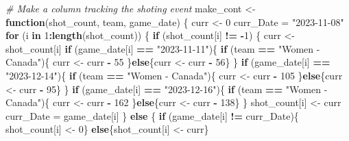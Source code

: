 \documentclass[
  a3paper,
]{article}
\newenvironment{Shaded}{\begin{snugshade}}{\end{snugshade}}
\newcommand{\CommentTok}[1]{\textcolor[rgb]{0.56,0.35,0.01}{\textit{#1}}}
\newcommand{\ControlFlowTok}[1]{\textcolor[rgb]{0.13,0.29,0.53}{\textbf{#1}}}
\newcommand{\DecValTok}[1]{\textcolor[rgb]{0.00,0.00,0.81}{#1}}
\newcommand{\FunctionTok}[1]{\textcolor[rgb]{0.13,0.29,0.53}{\textbf{#1}}}
\newcommand{\NormalTok}[1]{#1}
\newcommand{\OtherTok}[1]{\textcolor[rgb]{0.56,0.35,0.01}{#1}}
\newcommand{\SpecialCharTok}[1]{\textcolor[rgb]{0.81,0.36,0.00}{\textbf{#1}}}
\newcommand{\StringTok}[1]{\textcolor[rgb]{0.31,0.60,0.02}{#1}}
\begin{document}
\begin{Shaded}
\begin{Highlighting}[]
\CommentTok{\# Make a column tracking the shoting event}
\NormalTok{make\_cont }\OtherTok{\textless{}{-}} \ControlFlowTok{function}\NormalTok{(shot\_count, team, game\_date) \{}
\NormalTok{  curr }\OtherTok{\textless{}{-}} \DecValTok{0}
\NormalTok{  curr\_Date }\OtherTok{=} \StringTok{"2023{-}11{-}08"}
  \ControlFlowTok{for}\NormalTok{ (i }\ControlFlowTok{in} \DecValTok{1}\SpecialCharTok{:}\FunctionTok{length}\NormalTok{(shot\_count)) \{}
    \ControlFlowTok{if}\NormalTok{ (shot\_count[i] }\SpecialCharTok{!=} \SpecialCharTok{{-}}\DecValTok{1}\NormalTok{) \{}
\NormalTok{      curr }\OtherTok{\textless{}{-}}\NormalTok{ shot\_count[i]}
      \ControlFlowTok{if}\NormalTok{ (game\_date[i] }\SpecialCharTok{==} \StringTok{"2023{-}11{-}11"}\NormalTok{)\{}
        \ControlFlowTok{if}\NormalTok{ (team }\SpecialCharTok{==} \StringTok{"Women {-} Canada"}\NormalTok{)\{}
\NormalTok{          curr }\OtherTok{\textless{}{-}}\NormalTok{ curr }\SpecialCharTok{{-}} \DecValTok{55}
\NormalTok{        \}}\ControlFlowTok{else}\NormalTok{\{curr }\OtherTok{\textless{}{-}}\NormalTok{ curr }\SpecialCharTok{{-}} \DecValTok{56}\NormalTok{\}}
\NormalTok{      \}}
      \ControlFlowTok{if}\NormalTok{ (game\_date[i] }\SpecialCharTok{==} \StringTok{"2023{-}12{-}14"}\NormalTok{)\{}
        \ControlFlowTok{if}\NormalTok{ (team }\SpecialCharTok{==} \StringTok{"Women {-} Canada"}\NormalTok{)\{}
\NormalTok{          curr }\OtherTok{\textless{}{-}}\NormalTok{ curr }\SpecialCharTok{{-}} \DecValTok{105}
\NormalTok{        \}}\ControlFlowTok{else}\NormalTok{\{curr }\OtherTok{\textless{}{-}}\NormalTok{ curr }\SpecialCharTok{{-}} \DecValTok{95}\NormalTok{\}}
\NormalTok{      \}}
      \ControlFlowTok{if}\NormalTok{ (game\_date[i] }\SpecialCharTok{==} \StringTok{"2023{-}12{-}16"}\NormalTok{)\{}
        \ControlFlowTok{if}\NormalTok{ (team }\SpecialCharTok{==} \StringTok{"Women {-} Canada"}\NormalTok{)\{}
\NormalTok{          curr }\OtherTok{\textless{}{-}}\NormalTok{ curr }\SpecialCharTok{{-}} \DecValTok{162}
\NormalTok{        \}}\ControlFlowTok{else}\NormalTok{\{curr }\OtherTok{\textless{}{-}}\NormalTok{ curr }\SpecialCharTok{{-}} \DecValTok{138}\NormalTok{\}}
\NormalTok{      \}}
\NormalTok{      shot\_count[i] }\OtherTok{\textless{}{-}}\NormalTok{ curr}
\NormalTok{      curr\_Date }\OtherTok{=}\NormalTok{ game\_date[i]}
\NormalTok{    \} }\ControlFlowTok{else}\NormalTok{ \{}
      \ControlFlowTok{if}\NormalTok{ (game\_date[i] }\SpecialCharTok{!=}\NormalTok{ curr\_Date)\{}
\NormalTok{        shot\_count[i] }\OtherTok{\textless{}{-}} \DecValTok{0}\NormalTok{\}}
      \ControlFlowTok{else}\NormalTok{\{shot\_count[i] }\OtherTok{\textless{}{-}}\NormalTok{ curr\}}
      

\end{Highlighting}
\end{Shaded}
\end{document}
